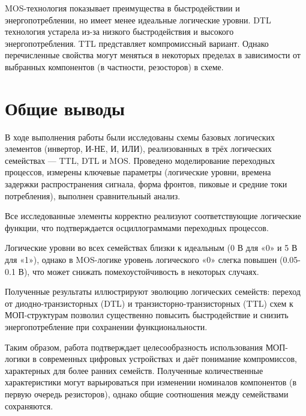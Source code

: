MOS-технология показывает преимущества в быстродействии и энергопотреблении, но имеет менее идеальные логические уровни. DTL технология устарела из-за низкого быстродействия и высокого энергопотребления. TTL представляет компромиссный вариант. Однако перечисленные свойства могут меняться в некоторых пределах в зависимости от выбранных компонентов (в частности, резосторов) в схеме.

\section{Общие выводы}

В ходе выполнения работы были исследованы схемы базовых логических элементов (инвертор, И-НЕ, И, ИЛИ), реализованных в трёх логических семействах — TTL, DTL и MOS. Проведено моделирование переходных процессов, измерены ключевые параметры (логические уровни, времена задержки распространения сигнала, форма фронтов, пиковые и средние токи потребления), выполнен сравнительный анализ.

Все исследованные элементы корректно реализуют соответствующие логические функции, что подтверждается осциллограммами переходных процессов.

Логические уровни во всех семействах близки к идеальным (0 В для «0» и 5 В для «1»), однако в MOS-логике уровень логического «0» слегка повышен (0.05-0.1 В), что может снижать помехоустойчивость в некоторых случаях.

Полученные результаты иллюстрируют эволюцию логических семейств: переход от диодно-транзисторных (DTL) и транзисторно-транзисторных (TTL) схем к МОП-структурам позволил существенно повысить быстродействие и снизить энергопотребление при сохранении функциональности.

Таким образом, работа подтверждает целесообразность использования МОП-логики в современных цифровых устройствах и даёт понимание компромиссов, характерных для более ранних семейств. Полученные количественные характеристики могут варьироваться при изменении номиналов компонентов (в первую очередь резисторов), однако общие соотношения между семействами сохраняются.
